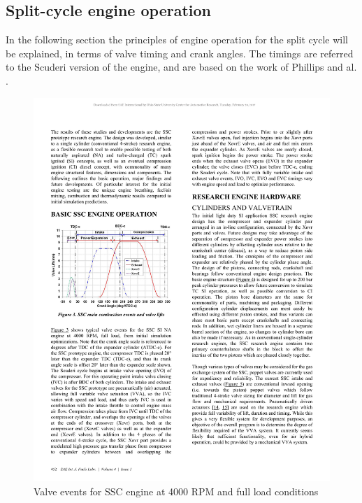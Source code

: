 \subsection{Split-cycle engine operation}

In the following section the principles of engine operation for the split cycle will be explained, in terms of valve timing and crank angles. The timings are referred to the Scuderi version of the engine, and are based on the work of Phillips and al. \cite{Phillips2011a}.

\begin{figure}[ht]
  \centering
  \includegraphics[width=\textwidth]{figures/introduction/split_timing.pdf}
  \caption{Valve events for SSC engine at 4000 RPM and full load conditions\label{fig:split_timing} }
\end{figure}

